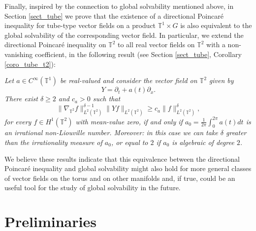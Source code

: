 \documentclass[11pt]{amsart}
\numberwithin{theorem}{section}
\numberwithin{equation}{section}
\theoremstyle{definition}
\numberwithin{example}{section}
\theoremstyle{definition}
\theoremstyle{definition}
\newcommand{\T}{\mathbb{T}}
\begin{document}
Finally, inspired  by the connection to global solvability mentioned above,  in Section \ref{sect_tube} we prove that the existence of a directional Poincaré inequality for tube-type vector fields on a product $\T^1\times G$ is also equivalent to the global solvability of the corresponding vector field. In particular, we extend the directional Poincaré inequality on $\T^2$ to all real vector fields on $\T^2$ with a non-vanishing coefficient, in the following result (see Section \ref{sect_tube}, Corollary \ref{coro_tube_t2}):

\emph{
     Let $a\in C^\infty(\T^1)$ be real-valued and consider the vector field on $\T^2$ given by
     \begin{equation*}
         Y=\partial_t+a(t)\partial_x.
     \end{equation*}
     There exist $\delta\geq 2$ and  $c_a>0$ such that
          \begin{equation*}
        \|\nabla_{\T^2} f\|_{L^2(\T^2)}^{\delta-1}\| Y f \|_{L^2(\T^2)}\geq c_a\|f\|_{L^2(\T^2)}^\delta,
    \end{equation*}
    for every $f\in H^1(\T^2)$ with mean-value zero, if and only if 
     $a_0=\frac{1}{2\pi}\int_0^{2\pi} a(t)dt$ is an irrational non-Liouville number. Moreover: in this case we can take $\delta$ greater than the irrationality measure of $a_0$, or equal to $2$ if $a_0$ is algebraic of degree $2$. 
}

We believe these results indicate that this equivalence between the directional Poincaré inequality and global solvability might also hold for more general classes of vector fields on the torus and on other manifolds and, if true, could be an useful tool for the study of global solvability in the future.





\section{Preliminaries}\label{sect_pre}
\end{document}
